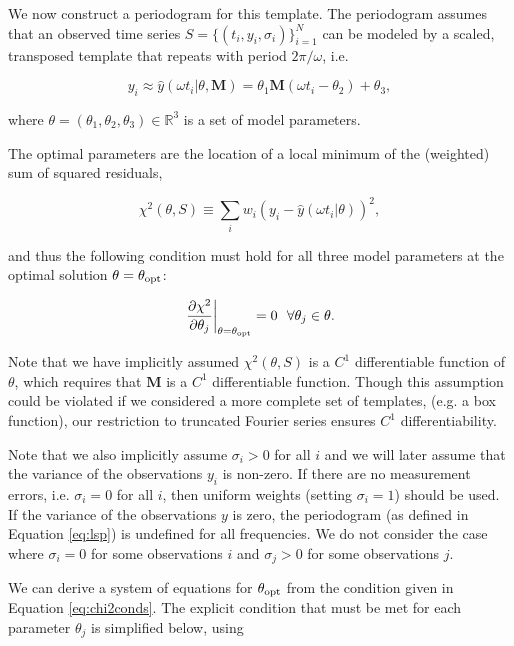 \documentclass{aastex62}
\begin{document}
We now construct a periodogram for this template. The periodogram assumes
that an observed time series $S = \{(t_i, y_i, \sigma_i)\}_{i=1}^N$ can be modeled
by a scaled, transposed template that repeats with period $2\pi / \omega$, i.e.

\begin{equation}
y_i \approx \hat{y}(\omega t_i|\theta, \mathbf{M}) = \theta_1\mathbf{M}(\omega t_i - \theta_2) + \theta_3,
\end{equation}

\noindent where $\theta = (\theta_1, \theta_2, \theta_3)\in \mathbb{R}^3$ is a set of model parameters.

The optimal parameters are the location of a local minimum of the (weighted) sum of
squared residuals,

\begin{equation}
    \chi^2(\theta, S) \equiv \sum_i w_i (y_i - \hat{y}(\omega t_i|\theta) )^2,
\end{equation}

\noindent and thus the following condition must hold for all three model parameters at
the optimal solution $\theta=\theta_{\rm opt}$:

\begin{equation}\label{eq:chi2conds}
    \left.\frac{\partial\chi^2}{\partial\theta_j}\right|_{\theta=\theta_{\rm opt}} = 0~~\forall\theta_j\in\theta.
\end{equation}

Note that we have implicitly assumed $\chi^2(\theta,S)$ is a $C^1$ differentiable
function of $\theta$, which requires that $\mathbf{M}$ is a
$C^1$ differentiable function. Though this assumption could be violated if we
considered a more complete set of templates, (e.g. a box function), our restriction
to truncated Fourier series ensures $C^1$ differentiability.

Note that we also implicitly assume $\sigma_i > 0$ for all $i$ and we will later
assume that the variance of the observations $y_i$ is non-zero. If there are no
measurement errors, i.e. $\sigma_i = 0$ for all $i$, then uniform weights
(setting $\sigma_i = 1$) should be used. If the variance of the observations $y$
is zero, the periodogram (as defined in Equation \ref{eq:lsp}) is undefined for all frequencies. We do not
consider the case where $\sigma_i = 0$ for some observations $i$ and $\sigma_j > 0$ for
some observations $j$.

We can derive a system of equations for $\theta_{\rm opt}$ from the condition given
in Equation \ref{eq:chi2conds}. The explicit condition that must be met for each parameter $\theta_j$ is simplified below,
using
\end{document}
